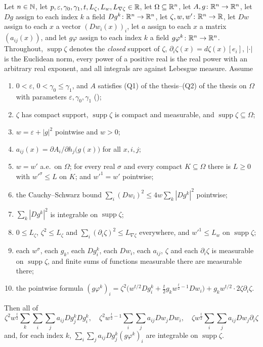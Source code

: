 \begin{helper}
Let $n\in\mathbb{N}$, let $p,\varepsilon,\gamma_0,\gamma_1,t,L_\zeta,L_w,L_{\nabla\zeta}\in\mathbb{R}$,
let $\Omega\subseteq\mathbb{R}^n$, let $A,g\colon\mathbb{R}^n\to\mathbb{R}^n$, let $Dg$ assign to each
index $k$ a field $Dg^k\colon\mathbb{R}^n\to\mathbb{R}^n$, let
$\zeta,w,w'\colon\mathbb{R}^n\to\mathbb{R}$, let $Dw$ assign to each $x$ a vector
$(Dw_i(x))_i$, let $a$ assign to each $x$ a matrix $(a_{ij}(x))$, and let
$g\varphi$ assign to each index $k$ a field
$g\varphi^k\colon\mathbb{R}^n\to\mathbb{R}^n$.  Throughout, $\operatorname{supp}\zeta$ denotes
the \emph{closed} support of $\zeta$,
$\partial_i\zeta(x)=d\zeta(x)[e_i]$, $|\cdot|$ is the Euclidean norm, every
power of a positive real is the real power with an arbitrary real exponent, and
all integrals are against Lebesgue measure.  Assume
\begin{enumerate}
\item[(H1)] $0<\varepsilon$, $0<\gamma_0\le\gamma_1$, and $A$ satisfies
  (Q1) of the thesis--(Q2) of the thesis on $\Omega$ with parameters
  $\varepsilon,\gamma_0,\gamma_1$ ();
\item[(H2)] $\zeta$ has compact support, $\operatorname{supp}\zeta$ is compact
  and measurable, and $\operatorname{supp}\zeta\subseteq\Omega$;
\item[(H3)] $w=\varepsilon+|g|^2$ pointwise and $w>0$;
\item[(H4)] $a_{ij}(x)=\partial A_i/\partial h_j\bigl(g(x)\bigr)$ for all
  $x,i,j$;
\item[(H5)] $w=w'$ a.e.\ on $\Omega$; for every real $\sigma$ and every compact
  $K\subseteq\Omega$ there is $L\ge0$ with $w'^\sigma\le L$ on $K$; and
  $w'^1=w'$ pointwise;
\item[(H6)] the Cauchy--Schwarz bound
  $\sum_i(Dw_i)^2\le4w\sum_k|Dg^k|^2$ pointwise;
\item[(H7)] $\sum_k|Dg^k|^2$ is integrable on $\operatorname{supp}\zeta$;
\item[(H8)] $0\le L_\zeta$, $\zeta^2\le L_\zeta$ and
  $\sum_i(\partial_i\zeta)^2\le L_{\nabla\zeta}$ everywhere, and
  $w'^1\le L_w$ on $\operatorname{supp}\zeta$;
\item[(H9)] each $w^\sigma$, each $g_k$, each $Dg^k_i$, each $Dw_i$, each
  $a_{ij}$, $\zeta$ and each $\partial_i\zeta$ is measurable on
  $\operatorname{supp}\zeta$, and finite sums of functions measurable there are
  measurable there;
\item[(H10)] the pointwise formula
  $(g\varphi^k)_i=\zeta^2\bigl(w^{t/2}Dg^k_i
    +\tfrac t2g_kw^{\frac t2-1}Dw_i\bigr)+g_kw^{t/2}\cdot2\zeta\partial_i\zeta$.
\end{enumerate}
Then all of
\[
\zeta^2w^{\frac t2}\!\!\sum_k\sum_i\sum_j\!a_{ij}Dg^k_jDg^k_i,\quad
\zeta^2w^{\frac t2-1}\!\!\sum_i\sum_j\!a_{ij}Dw_jDw_i,\quad
\zeta w^{\frac t2}\!\!\sum_i\sum_j\!a_{ij}Dw_j\partial_i\zeta
\]
and, for each index $k$, $\sum_i\sum_ja_{ij}Dg^k_j(g\varphi^k)_i$ are
integrable on $\operatorname{supp}\zeta$.
\end{helper}
